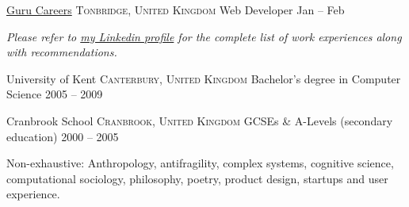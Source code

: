 \documentclass[10pt,a4paper]{article}
\begin{document}
\headedsection
  {\href{http://gurucareers.com}{Guru Careers}}
  {\textsc{Tonbridge, United Kingdom}} {%
  \headedsubsection
    {Web Developer}
    {Jan  -- Feb }
    {}
}

\begin{center}
  \emph{Please refer to \href{http://www.linkedin.com/in/heyseb}{my Linkedin profile} for the complete list of work experiences along with recommendations.}
\end{center}


\spacedhrule{-0.2em}{-0.4em}


\headedsection
  {University of Kent}
  {\textsc{Canterbury, United Kingdom}} {%
  \headedsubsection
    {Bachelor's degree in Computer Science}
    {2005 -- 2009}
    {
  }
}

\headedsection
  {Cranbrook School}
  {\textsc{Cranbrook, United Kingdom}} {%
  \headedsubsection
    {GCSEs \& A-Levels \textnormal{(secondary education)}}
    {2000 -- 2005}
    {\bodytext{}
  }
}

\spacedhrule{0em}{-0.4em}


\inlineheadsection
  {Non-exhaustive:}
  {Anthropology, antifragility, complex systems, cognitive science, computational sociology, philosophy, poetry, product design, startups and user experience.}
\end{document}
